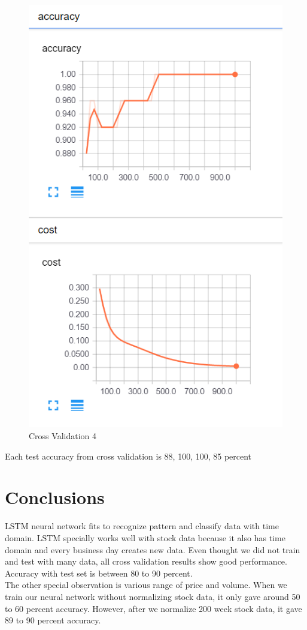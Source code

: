 \documentclass[12pt]{article}
\begin{document}
\begin{figure}[H]
	\begin{center}
	\includegraphics{./pictures/cv4.png}
	\caption{Cross Validation 4}
	\label{GD}
	\end{center}
\end{figure}

Each test accuracy from cross validation is 88, 100, 100, 85 percent

\section{Conclusions}
LSTM neural network fits to recognize pattern and classify data with time domain. LSTM specially works well with stock data because it also has time domain and every business day creates new data. Even thought we did not train and test with many data, all cross validation results show good performance. Accuracy with test set is between 80 to 90 percent.\\
The other special observation is various range of price and volume. When we train our neural network without normalizing stock data, it only gave around 50 to 60 percent accuracy. However, after we normalize 200 week stock data, it gave 89 to 90 percent accuracy.
\end{document}
